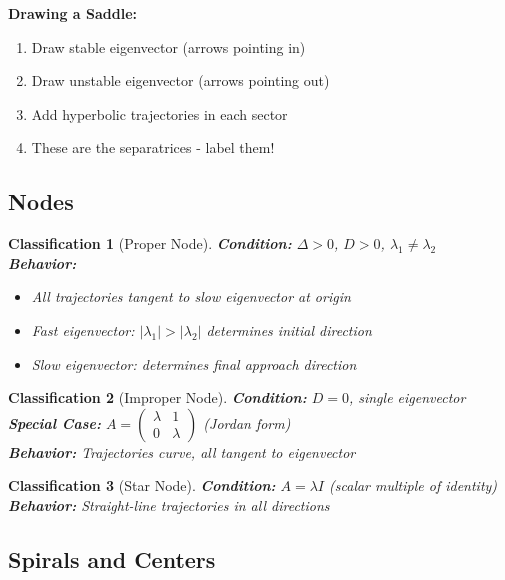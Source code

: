 \documentclass[12pt]{article}
\newtheorem{classification}{Classification}
\begin{document}
\begin{examtip}
\textbf{Drawing a Saddle:}
\begin{enumerate}
    \item Draw stable eigenvector (arrows pointing in)
    \item Draw unstable eigenvector (arrows pointing out)
    \item Add hyperbolic trajectories in each sector
    \item These are the separatrices - label them!
\end{enumerate}
\end{examtip}

\subsection{Nodes}

\begin{classification}[Proper Node]
\textbf{Condition:} $\Delta > 0$, $D > 0$, $\lambda_{1} \neq \lambda_{2}$\\
\textbf{Behavior:}
\begin{itemize}
    \item All trajectories tangent to slow eigenvector at origin
    \item Fast eigenvector: $|\lambda_{1}| > |\lambda_{2}|$ determines initial direction
    \item Slow eigenvector: determines final approach direction
\end{itemize}
\end{classification}

\begin{classification}[Improper Node]
\textbf{Condition:} $D = 0$, single eigenvector\\
\textbf{Special Case:} $A = \begin{pmatrix} \lambda & 1 \\ 0 & \lambda \end{pmatrix}$ (Jordan form)\\
\textbf{Behavior:} Trajectories curve, all tangent to eigenvector
\end{classification}

\begin{classification}[Star Node]
\textbf{Condition:} $A = \lambda I$ (scalar multiple of identity)\\
\textbf{Behavior:} Straight-line trajectories in all directions
\end{classification}

\subsection{Spirals and Centers}
\end{document}
